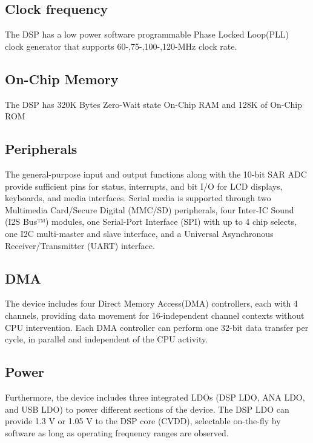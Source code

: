 \subsection{Clock frequency}The DSP has a low power software programmable Phase Locked Loop(PLL) clock generator that  supports 60-,75-,100-,120-MHz clock rate.  
\subsection{On-Chip Memory}The DSP has 320K Bytes Zero-Wait state On-Chip RAM and 128K of On-Chip ROM

\subsection{Peripherals} The general-purpose input and output functions along with the 10-bit SAR ADC provide sufficient pins for status, interrupts, and bit I/O for LCD displays, keyboards, and media interfaces. Serial media is supported through two Multimedia Card/Secure Digital (MMC/SD) peripherals, four Inter-IC Sound (I2S Bus™) modules, one Serial-Port Interface (SPI) with up to 4 chip selects, one I2C multi-master and slave interface, and a Universal Asynchronous Receiver/Transmitter (UART) interface. 

\subsection{DMA} The device includes four Direct Memory Access(DMA) controllers, each with 4 channels, providing data movement for 16-independent channel contexts without CPU intervention. Each DMA controller can perform one 32-bit data transfer per cycle, in parallel and independent of the CPU activity.


\subsection{Power} Furthermore, the device includes three integrated LDOs (DSP LDO, ANA LDO, and USB LDO) to power different sections of the device. The DSP LDO can provide 1.3 V or 1.05 V to the DSP core (CVDD), 
selectable on-the-fly by software as long as operating frequency ranges are observed. 


